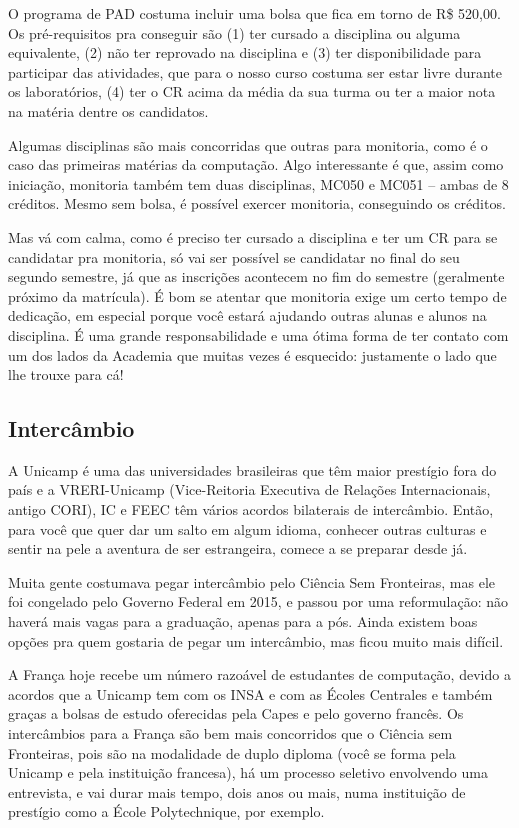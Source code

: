 O programa de PAD costuma incluir uma bolsa que fica em torno de R\$ 520,00.
Os pré-requisitos pra conseguir são (1) ter cursado a disciplina ou alguma
equivalente, (2) não ter reprovado na disciplina e (3) ter disponibilidade para
participar das atividades, que para o nosso curso costuma ser estar livre
durante os laboratórios, (4) ter o CR acima da média da sua turma ou ter a
maior nota na matéria dentre os candidatos.

Algumas disciplinas são mais concorridas que outras para monitoria, como é o
caso das primeiras matérias da computação. Algo interessante é que, assim como
iniciação, monitoria também tem duas disciplinas, MC050 e MC051 -- ambas de 8
créditos. Mesmo sem bolsa, é possível exercer monitoria, conseguindo os
créditos.

Mas vá com calma, como é preciso ter cursado a disciplina e ter um CR para se
candidatar pra monitoria, só vai ser possível se candidatar no final do seu
segundo semestre, já que as inscrições acontecem no fim do semestre (geralmente
próximo da matrícula). É bom se atentar que monitoria exige um certo tempo de
dedicação, em especial porque você estará ajudando outras alunas e alunos na
disciplina. É uma grande responsabilidade e uma ótima forma de ter contato com
um dos lados da Academia que muitas vezes é esquecido: justamente o lado que
lhe trouxe para cá!

\subsection{Intercâmbio}

A Unicamp é uma das universidades brasileiras que têm maior prestígio fora do
país e a VRERI-Unicamp (Vice-Reitoria Executiva de Relações Internacionais,
antigo CORI), IC e FEEC têm vários acordos bilaterais de intercâmbio. Então,
para você que quer dar um salto em algum idioma, conhecer outras culturas e
sentir na pele a aventura de ser estrangeira, comece a se preparar desde já.

Muita gente costumava pegar intercâmbio pelo Ciência Sem Fronteiras, mas ele
foi congelado pelo Governo Federal em 2015, e passou por uma reformulação: não
haverá mais vagas para a graduação, apenas para a pós. Ainda existem boas
opções pra quem gostaria de pegar um intercâmbio, mas ficou muito mais difícil.

A França hoje recebe um número razoável de estudantes de computação, devido a
acordos que a Unicamp tem com os INSA e com as Écoles Centrales e também graças
a bolsas de estudo oferecidas pela Capes e pelo governo francês. Os
intercâmbios para a França são bem mais concorridos que o Ciência sem
Fronteiras, pois são na modalidade de duplo diploma (você se forma pela Unicamp
e pela instituição francesa), há um processo seletivo envolvendo uma
entrevista, e vai durar mais tempo, dois anos ou mais, numa instituição de
prestígio como a École Polytechnique, por exemplo.

